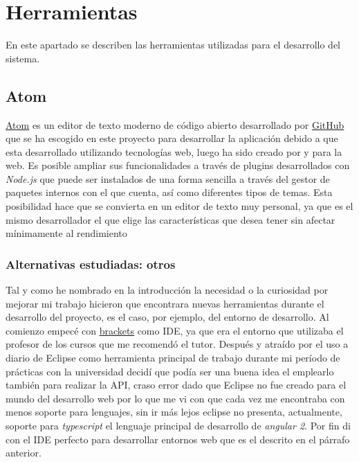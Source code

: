 

\section{Herramientas}\label{herramientas}
En este apartado se describen las herramientas utilizadas para el desarrollo del sistema.

\subsection{Atom}\label{atom}
\hyperlink{https://atom.io/}{Atom} es un editor de texto moderno de código abierto desarrollado por  \hyperlink{http://brackets.io/}{GitHub}  que se ha escogido en este proyecto para desarrollar la aplicación debido a que esta desarrollado utilizando tecnologías web, luego ha sido creado por y para la web. Es posible ampliar sus funcionalidades a través de plugins desarrollados con \emph{Node.js} que puede ser instalados de una forma sencilla a través del gestor de paquetes internos con el que cuenta, así como diferentes tipos de temas. Esta posibilidad hace que se convierta en un editor de texto muy personal, ya que es el mismo desarrollador el que elige las características que desea tener sin afectar mínimamente al rendimiento


\subsubsection{Alternativas estudiadas: otros }\label{detalle IDE}
Tal y como he nombrado en la introducción la necesidad o la curiosidad por mejorar mi trabajo hicieron que encontrara nuevas herramientas durante el desarrollo del proyecto, es el caso, por ejemplo, del entorno de desarrollo. Al comienzo empecé con \hyperlink{http://brackets.io/}{brackets} como IDE, ya que era el entorno que utilizaba el profesor de los cursos que me recomendó el tutor. Después y atraído por el uso a diario de Eclipse como herramienta principal de trabajo durante mi período de prácticas con la universidad decidí que podía ser una buena idea el emplearlo también para realizar la API, craso error dado que Eclipse no fue creado para el mundo del desarrollo web por lo que me vi con que cada vez me encontraba con menos soporte para lenguajes, sin ir más lejos eclipse no presenta, actualmente, soporte para  \emph{typescript} el lenguaje principal de desarrollo de  \emph{angular 2}. Por fin di con el IDE perfecto para desarrollar entornos web que es el descrito en el párrafo anterior.

